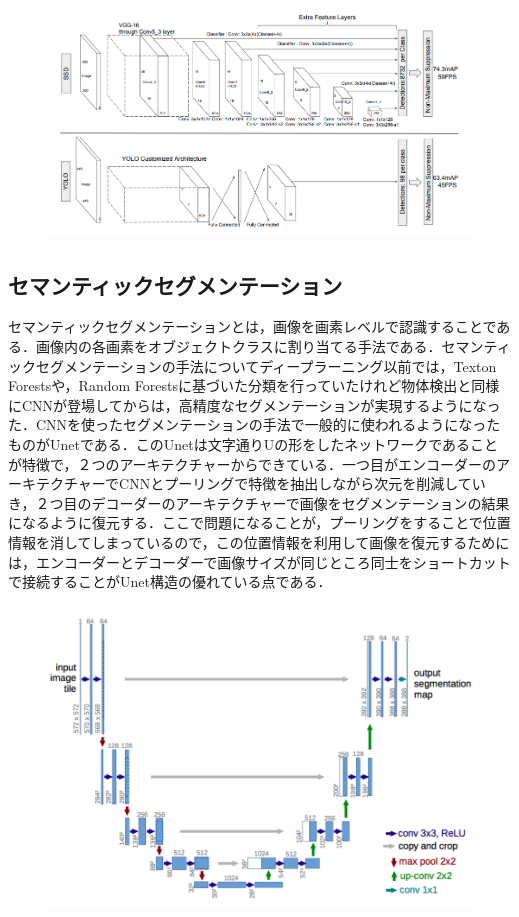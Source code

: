 \begin{figure}[h]
\centering
\includegraphics[width=0.7\linewidth]{fig/yolo_ssd.png}
\end{figure}

\subsection*{セマンティックセグメンテーション}
セマンティックセグメンテーションとは，画像を画素レベルで認識することである．画像内の各画素をオブジェクトクラスに割り当てる手法である．セマンティックセグメンテーションの手法についてディープラーニング以前では，Texton Forestsや，Random Forestsに基づいた分類を行っていたけれど物体検出と同様にCNNが登場してからは，高精度なセグメンテーションが実現するようになった．CNNを使ったセグメンテーションの手法で一般的に使われるようになったものがUnetである．このUnetは文字通りUの形をしたネットワークであることが特徴で，２つのアーキテクチャーからできている．一つ目がエンコーダーのアーキテクチャーでCNNとプーリングで特徴を抽出しながら次元を削減していき，２つ目のデコーダーのアーキテクチャーで画像をセグメンテーションの結果になるように復元する．ここで問題になることが，プーリングをすることで位置情報を消してしまっているので，この位置情報を利用して画像を復元するためには，エンコーダーとデコーダーで画像サイズが同じところ同士をショートカットで接続することがUnet構造の優れている点である．

\begin{figure}[h]
\centering
\includegraphics[width=0.7\linewidth]{fig/unet.png}
\end{figure}

